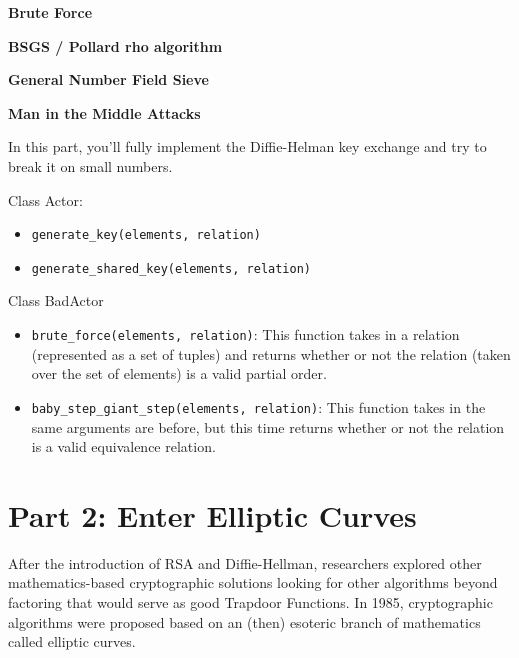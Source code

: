 \documentclass{article}
\begin{document}
\begin{center}
    \textbf{Brute Force}
\end{center}

\begin{center}
    \textbf{BSGS / Pollard rho algorithm}
\end{center}

\begin{center}
    \textbf{General Number Field Sieve}
\end{center}

\begin{center}
    \textbf{Man in the Middle Attacks}
\end{center}

\begin{tcolorbox}
    In this part, you'll fully implement the Diffie-Helman key exchange and try to break it on small numbers.

    Class Actor:
    \begin{itemize}
        \item \lstinline{generate_key(elements, relation)}
        \item \lstinline{generate_shared_key(elements, relation)}
    \end{itemize}

    Class BadActor
    \begin{itemize}
            \item \lstinline{brute_force(elements, relation)}: This function takes in a relation (represented as a set of tuples) and returns whether or not the relation (taken over the set of elements) is a valid partial order.
            \item \lstinline{baby_step_giant_step(elements, relation)}: This function takes in the same arguments are before, but this time returns whether or not the relation is a valid equivalence relation.
        \end{itemize}
\end{tcolorbox}


\section*{Part 2: Enter Elliptic Curves}

After the introduction of RSA and Diffie-Hellman, researchers explored other mathematics-based cryptographic solutions looking for other algorithms beyond factoring that would serve as good Trapdoor Functions. In 1985, cryptographic algorithms were proposed based on an (then) esoteric branch of mathematics called elliptic curves.
\end{document}
